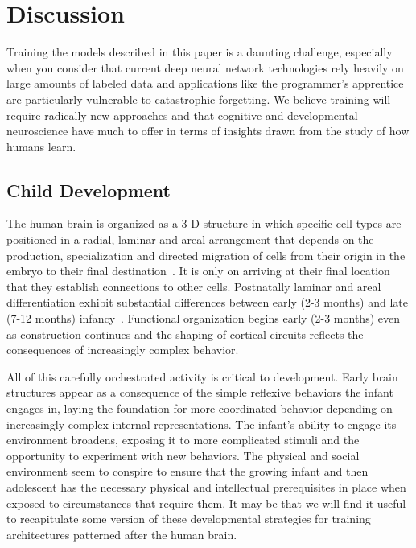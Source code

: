 

\section{Discussion}


Training the models described in this paper is a daunting challenge, especially when you consider that current deep neural network technologies rely heavily on large amounts of labeled data and applications like the programmer's apprentice are particularly vulnerable to catastrophic forgetting. We believe training will require radically new approaches and that cognitive and developmental neuroscience have much to offer in terms of insights drawn from the study of how humans learn. 


\subsection{Child Development}


The human brain is organized as a 3-D structure in which specific cell types are positioned in a radial, laminar and areal arrangement that depends on the production, specialization and directed migration of cells from their origin in the embryo to their final destination~\cite{RakiketalTCN-09}. It is only on arriving at their final location that they establish connections to other cells. Postnatally laminar and areal differentiation exhibit substantial differences between early (2-3 months) and late (7-12 months) infancy~\cite{MolnaretalJoA-19,KostovicandJudasTCN-09}. Functional organization begins early (2-3 months) even as construction continues and the shaping of cortical circuits reflects the consequences of increasingly complex behavior. 

All of this carefully orchestrated activity is critical to development. Early brain structures appear as a consequence of the simple reflexive behaviors the infant engages in, laying the foundation for more coordinated behavior depending on increasingly complex internal representations. The infant's ability to engage its environment broadens, exposing it to more complicated stimuli and the opportunity to experiment with new behaviors. The physical and social environment seem to conspire to ensure that the growing infant and then adolescent has the necessary physical and intellectual prerequisites in place when exposed to circumstances that require them. It may be that we will find it useful to recapitulate some version of these developmental strategies for training architectures patterned after the human brain.

